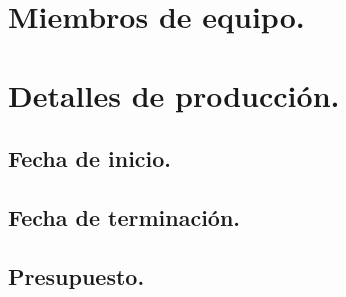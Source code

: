 \documentclass[11pt,letterpaper]{article}
\begin{document}
\section{Miembros de equipo.}

\section{Detalles de producción.}
\subsection{Fecha de inicio.}
\subsection{Fecha de terminación.}
\subsection{Presupuesto.}

\printglossary
\end{document}
